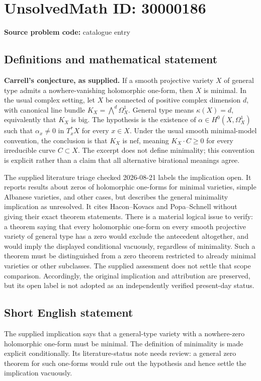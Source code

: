 \documentclass[11pt]{article}
\begin{document}
\section*{UnsolvedMath ID: 30000186}
\textbf{Source problem code:} catalogue entry
\subsection{Definitions and mathematical statement}
\textbf{Carrell's conjecture, as supplied.} If a smooth projective variety \(X\) of general type admits a nowhere-vanishing holomorphic one-form, then \(X\) is minimal. In the usual complex setting, let \(X\) be connected of positive complex dimension \(d\), with canonical line bundle \(K_X=\bigwedge^d\Omega_X^1\). General type means \(\kappa(X)=d\), equivalently that \(K_X\) is big. The hypothesis is the existence of \(\alpha\in H^0(X,\Omega_X^1)\) such that \(\alpha_x\ne0\) in \(T_x^*X\) for every \(x\in X\). Under the usual smooth minimal-model convention, the conclusion is that \(K_X\) is nef, meaning \(K_X\cdot C\ge0\) for every irreducible curve \(C\subset X\). The excerpt does not define minimality; this convention is explicit rather than a claim that all alternative birational meanings agree.\par The supplied literature triage checked 2026-08-21 labels the implication open. It reports results about zeros of holomorphic one-forms for minimal varieties, simple Albanese varieties, and other cases, but describes the general minimality implication as unresolved. It cites Hacon--Kovacs and Popa--Schnell without giving their exact theorem statements. There is a material logical issue to verify: a theorem saying that every holomorphic one-form on every smooth projective variety of general type has a zero would exclude the antecedent altogether, and would imply the displayed conditional vacuously, regardless of minimality. Such a theorem must be distinguished from a zero theorem restricted to already minimal varieties or other subclasses. The supplied assessment does not settle that scope comparison. Accordingly, the original implication and attribution are preserved, but its open label is not adopted as an independently verified present-day status.
\subsection{Short English statement}
The supplied implication says that a general-type variety with a nowhere-zero holomorphic one-form must be minimal. The definition of minimality is made explicit conditionally. Its literature-status note needs review: a general zero theorem for such one-forms would rule out the hypothesis and hence settle the implication vacuously.
\end{document}
